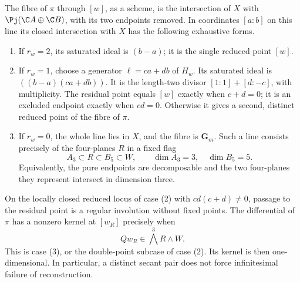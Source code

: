\begin{theorem}
\label{thm:exceptional-component-fibres}
The fibre of \(\pi\) through \([w]\), as a scheme, is the
intersection of \(X\) with \(\Pj(\C A\oplus\C B)\), with
its two endpoints removed.  In coordinates \([a:b]\) on this line
its closed intersection with \(X\) has the following exhaustive forms.
\begin{enumerate}
\item If \(r_w=2\), its saturated ideal is \((b-a)\); it is the
single reduced point \([w]\).
\item If \(r_w=1\), choose a generator
\(\ell=ca+db\) of \(H_w\).  Its saturated ideal is
\(((b-a)(ca+db))\).  It is the length-two divisor
\([1:1]+[d:-c]\), with multiplicity.  The residual point equals
\([w]\) exactly when \(c+d=0\); it is an excluded endpoint exactly
when \(cd=0\).  Otherwise it gives a second, distinct reduced point
of the fibre of \(\pi\).
\item If \(r_w=0\), the whole line lies in \(X\), and the fibre
is \(\mathbf G_m\).  Such a line consists precisely of the
four-planes \(R\) in a fixed flag
\[
 A_3\subset R\subset B_5\subset W,\qquad
          \dim A_3=3,\quad\dim B_5=5.
\]
Equivalently, the pure endpoints are decomposable and the two
four-planes they represent intersect in dimension three.
\end{enumerate}
On the locally closed reduced locus of case (2) with
\(cd(c+d)\ne0\), passage to the residual point is a regular
involution without fixed points.  The differential of \(\pi\) has a
nonzero kernel at \([w_R]\) precisely when
\begin{equation}\label{eq:exceptional-tangent-criterion}
 Qw_R\in \bigwedge^3R\wedge W.
\end{equation}
This is case (3), or the double-point subcase of case (2).
Its kernel is then one-dimensional.  In particular, a distinct
secant pair does not force infinitesimal failure of reconstruction.
\end{theorem}
